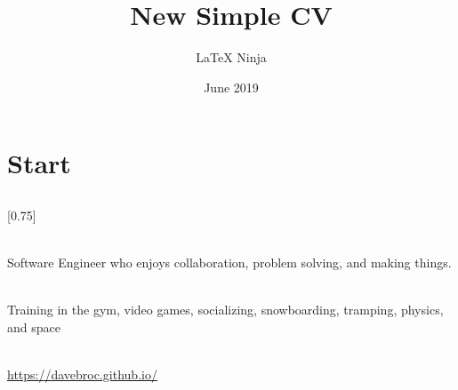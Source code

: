 \documentclass[lighthipster]{simplehipstercv}
\title{New Simple CV}
\author{\LaTeX{} Ninja}
\date{June 2019}
\begin{document}
    
    
    \thispagestyle{empty}
    \section*{Start}
    
    
    
    \subsection*{}
    \vspace{4em}
    
    \setlength{\columnsep}{1.5cm}
    [0.75]
    \begin{paracol}{2}
    
    \paracolbackgroundoptions
    
    
    
    \footnotesize
    {\setasidefontcolour
    \flushright
    \begin{center}
    \end{center}
    
    \\[0.5em]
    
    {\footnotesize
Software Engineer who enjoys collaboration, problem solving, and making things.
}
    
    \bigskip
    
    \\[0.5em]
    Training in the gym,
    video games, 
    socializing, 
    snowboarding, 
    tramping, 
    physics,
    and 
    space
    \bigskip

    \\[0.5em]
    \href{https://davebroc.github.io/}{https://davebroc.github.io/}

  
    \phantom{turn the page}
    
    \phantom{turn the page}
    }
    \switchcolumn
    
    \small

     \begin{minipage}[t]{0.7\textwidth}

\end{minipage}
\end{paracol}
\end{document}
